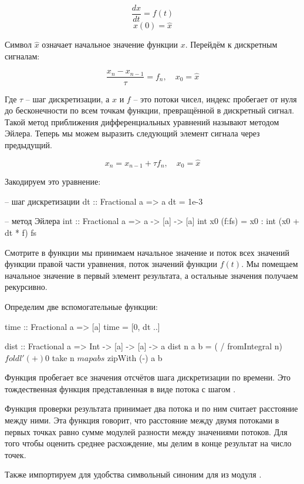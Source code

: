 \[ \frac{dx}{dt} = f(t)  \]
\[ x(0) = \hat{x} \]

Символ $\hat{x}$ означает начальное значение функции $x$.
Перейдём к дискретным сигналам:

\[ \frac{x_n - x_{n-1}}{\tau} = f_n, \quad x_0 = \hat{x} \]

Где $\tau$ -- шаг дискретизации, а $x$  и $f$ -- это потоки
чисел, индекс  пробегает от нуля до бесконечности по 
всем точкам функции, превращённой в дискретный сигнал. 
Такой метод приближения дифференциальных уравнений называют
методом Эйлера. 
Теперь мы можем выразить следующий элемент сигнала через
предыдущий. 

\[ x_n = x_{n-1} + \tau f_n, \quad x_0 = \hat{x} \]

Закодируем это уравнение:

\begin{code}
-- шаг дискретизации
dt :: Fractional a => a
dt = 1e-3

-- метод Эйлера
int :: Fractional a => a -> [a] -> [a]
int x0 (f:fs) = x0 : int (x0 + dt * f) fs
\end{code}

Смотрите в функции  мы принимаем начальное 
значение  и поток всех значений функции правой
части уравнения, поток значений функции $f(t)$. 
Мы помещаем начальное значение в первый элемент результата,
а остальные значения получаем рекурсивно. 

Определим две вспомогательные функции:

\begin{code}
time :: Fractional a => [a]
time = [0, dt ..]

dist :: Fractional a => Int -> [a] -> [a] -> a
dist n a b = ( / fromIntegral n) $ 
    foldl' (+) 0 $ take n $ map abs $ zipWith (-) a b
\end{code}

Функция  пробегает все значения отсчётов шага дискретизации
по времени. Это тождественная функция представленная в виде
потока с шагом .

Функция проверки результата  принимает
два потока и по ним считает расстояние между ними.
Эта функция говорит, что расстояние между двумя
потоками в  первых точках равно сумме
модулей разности между значениями потоков.
Для того чтобы оценить среднее расхождение, мы делим
в конце результат на число точек.

Также импортируем для удобства символьный синоним
для  из модуля .

